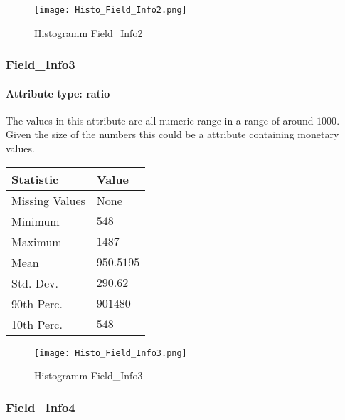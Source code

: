 \begin{figure}[H]
	\begin{center}
		\texttt{[image: Histo\_Field\_Info2.png]}
	\end{center}
	\caption{Histogramm Field\_Info2}
\end{figure}

\subsubsection{Field\_Info3}
\paragraph{Attribute type: ratio} The values in this attribute are all numeric range in a range of around $1000$. Given the size of the numbers this could be a attribute containing monetary values.

\begin{table}[H]
	\renewcommand{\arraystretch}{1.25}
	\begin{tabular}{l|l}
		\textbf{Statistic} & \textbf{Value}\\\hline
			Missing Values& None\\\hline
		Minimum& $548$\\\hline
		Maximum& $1487$\\\hline
		Mean& $950.5195$\\\hline
		Std. Dev.& $290.62$\\\hline
		90th Perc. & $901480$\\\hline
		10th Perc. & $548$ \\		
	\end{tabular}
\end{table}

\begin{figure}[H]
	\begin{center}
		\texttt{[image: Histo\_Field\_Info3.png]}
	\end{center}
	\caption{Histogramm Field\_Info3}
\end{figure}

\subsubsection{Field\_Info4}
